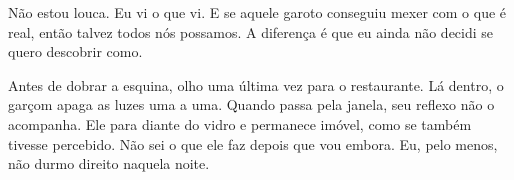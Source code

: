 \medskip

Não estou louca.  
Eu vi o que vi.  
E se aquele garoto conseguiu mexer com o que é real, então talvez todos nós possamos.  
A diferença é que eu ainda não decidi se quero descobrir como.

Antes de dobrar a esquina, olho uma última vez para o restaurante. Lá dentro, o garçom apaga as luzes uma a uma.
Quando passa pela janela, seu reflexo não o acompanha. Ele para diante do vidro e permanece imóvel, como se também tivesse percebido.
Não sei o que ele faz depois que vou embora. Eu, pelo menos, não durmo direito naquela noite.
